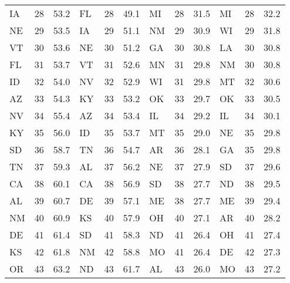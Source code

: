 \begin{longtable}{lrr|lrr||lrr|lrr}
        IA &   28 &   53.2 &            FL &   28 &  49.1 &             MI &   28 &   31.5 &            MI &   28 &   32.2 \\
        NE &   29 &   53.5 &            IA &   29 &  51.1 &             NM &   29 &   30.9 &            WI &   29 &   31.8 \\
        VT &   30 &   53.6 &            NE &   30 &  51.2 &             GA &   30 &   30.8 &            LA &   30 &   30.8 \\
        FL &   31 &   53.7 &            VT &   31 &  52.6 &             MN &   31 &   29.8 &            NM &   30 &   30.8 \\
        ID &   32 &   54.0 &            NV &   32 &  52.9 &             WI &   31 &   29.8 &            MT &   32 &   30.6 \\
        AZ &   33 &   54.3 &            KY &   33 &  53.2 &             OK &   33 &   29.7 &            OK &   33 &   30.5 \\
        NV &   34 &   55.4 &            AZ &   34 &  53.4 &             IL &   34 &   29.2 &            IL &   34 &   30.1 \\
        KY &   35 &   56.0 &            ID &   35 &  53.7 &             MT &   35 &   29.0 &            NE &   35 &   29.8 \\
        SD &   36 &   58.7 &            TN &   36 &  54.7 &             AR &   36 &   28.1 &            GA &   35 &   29.8 \\
        TN &   37 &   59.3 &            AL &   37 &  56.2 &             NE &   37 &   27.9 &            SD &   37 &   29.6 \\
        CA &   38 &   60.1 &            CA &   38 &  56.9 &             SD &   38 &   27.7 &            ND &   38 &   29.5 \\
        AL &   39 &   60.7 &            DE &   39 &  57.1 &             ME &   38 &   27.7 &            ME &   39 &   29.4 \\
        NM &   40 &   60.9 &            KS &   40 &  57.9 &             OH &   40 &   27.1 &            AR &   40 &   28.2 \\
        DE &   41 &   61.4 &            SD &   41 &  58.3 &             ND &   41 &   26.4 &            OH &   41 &   27.4 \\
        KS &   42 &   61.8 &            NM &   42 &  58.8 &             MO &   41 &   26.4 &            DE &   42 &   27.3 \\
        OR &   43 &   63.2 &            ND &   43 &  61.7 &             AL &   43 &   26.0 &            MO &   43 &   27.2 \\

\end{longtable}
